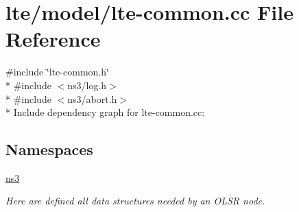 \hypertarget{lte-common_8cc}{}\section{lte/model/lte-\/common.cc File Reference}
\label{lte-common_8cc}
{\ttfamily \#include \char`\"{}lte-\/common.\+h\char`\"{}}\\*
{\ttfamily \#include $<$ns3/log.\+h$>$}\\*
{\ttfamily \#include $<$ns3/abort.\+h$>$}\\*
Include dependency graph for lte-\/common.cc\+:
\subsection*{Namespaces}
\begin{DoxyCompactItemize}
\item 
 \hyperlink{namespacens3}{ns3}
\begin{DoxyCompactList}\small\item\em Here are defined all data structures needed by an O\+L\+SR node. \end{DoxyCompactList}\end{DoxyCompactItemize}

